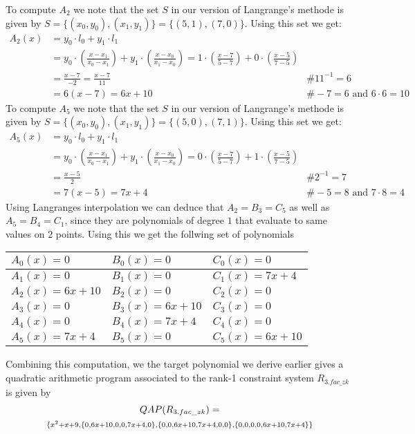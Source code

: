 \begin{example}
To compute $A_2$ we note that the set $S$ in our version of Langrange's methode is given by $S=\{(x_0,y_0), (x_1,y_1)\} = \{(5,1), (7,0)\}$. Using this set we get:
\begin{align*}
A_2(x) & = y_0\cdot l_0 + y_1\cdot l_1 \\
    & = y_0\cdot(\frac{x-x_1}{x_0-x_1}) + y_1\cdot(\frac{x-x_0}{x_1-x_0})
      = 1\cdot(\frac{x-7}{5-7}) + 0\cdot(\frac{x-5}{7-5}) \\
    & = \frac{x-7}{-2}
      = \frac{x-7}{11} & \text{\# } 11^{-1}=6 \\
    & = 6(x-7) 
      = 6x + 10 & \text{\# } -7 = 6 \text{ and } 6\cdot 6 = 10
\end{align*}
To compute $A_5$ we note that the set $S$ in our version of Langrange's methode is given by $S=\{(x_0,y_0), (x_1,y_1)\} = \{(5,0), (7,1)\}$. Using this set we get:
\begin{align*}
A_5(x) & = y_0\cdot l_0 + y_1\cdot l_1 \\
    & = y_0\cdot(\frac{x-x_1}{x_0-x_1}) + y_1\cdot(\frac{x-x_0}{x_1-x_0})
      = 0\cdot(\frac{x-7}{5-7}) + 1\cdot(\frac{x-5}{7-5}) \\
    & = \frac{x-5}{2} & \text{\# } 2^{-1}=7 \\
    & = 7(x-5) 
      = 7x + 4 & \text{\# } -5 = 8 \text{ and } 7\cdot 8 = 4
\end{align*}
Using Langranges interpolation we can deduce that $A_2=B_3=C_5$ as well as $A_5=B_4=C_1$, since they are polynomials of degree $1$ that evaluate to same values on $2$ points. Using this we get the follwing set of polynomials
\begin{center}
\begin{tabular}{|l|l|l|}\hline 
$A_{0}(x)=0 $ &$ B_{0}(x)=0   $ & $C_{0}(x)=0$ \tabularnewline\hline 
$A_1(x)=0 $ &$ B_1(x)=0   $ & $C_1(x)=7x+4$ \tabularnewline\hline 
$A_2(x)=6x+10$ &$ B_2(x)=0$ & $C_2(x)=0$ \tabularnewline\hline 
$A_3(x)=0    $ &$ B_3(x)=6x+10$ & $C_3(x)=0$ \tabularnewline\hline 
$A_4(x)=0$ &$ B_4(x)=7x+4  $ & $C_4(x)=0$ \tabularnewline\hline 
$A_5(x)=7x+4$ &$ B_5(x)=0      $ & $C_5(x)=6x+10$ \tabularnewline\hline 
\end{tabular}
\end{center}
Combining this computation, we the target polynomial we derive earlier gives a quadratic arithmetic program associated to the rank-1 constraint system $R_{3.fac\_zk}$ is given by
\begin{multline*}
QAP(R_{3.fac\_zk}) =\\
\scriptstyle \{x^{2}+x+9,\{0,6x+10,0,0,7x+4,0\},\{0,0,6x+10,7x+4,0,0\},\{0,0,0,0,6x+10,7x+4\}\}$$
\end{multline*}
\end{example}
